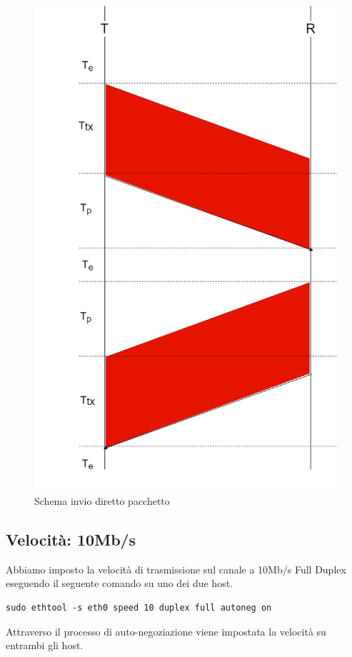 \documentclass{exam}
\begin{document}
 \begin{figure}[H]
	\centering
	\includegraphics[scale = 0.26]{Grafico2.png}
	\caption{Schema invio diretto pacchetto}
	\label{fig:GrafnoSwitch}
\end{figure}

\subsection{Velocità: 10Mb/s}\label{10NS}
Abbiamo imposto la velocità di trasmissione sul canale a 10Mb/s Full Duplex eseguendo il seguente comando su uno dei due host.
\begin{lstlisting}
sudo ethtool -s eth0 speed 10 duplex full autoneg on
\end{lstlisting}
Attraverso il processo di auto-negoziazione viene impostata la velocità su entrambi gli host.\\
\end{document}
